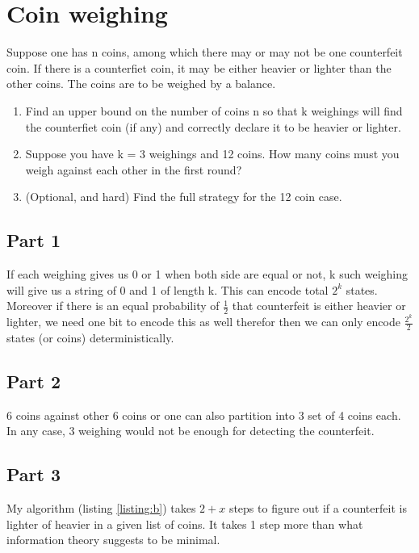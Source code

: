 \documentclass[a4paper,10pt]{article}
\begin{document}
\section{Coin weighing}

Suppose one has n coins, among which there may or may not be one counterfeit
coin. If there is a counterfiet coin, it may be either heavier or lighter than
the other coins. The coins are to be weighed by a balance.

\begin{enumerate}
    \item Find an upper bound on the number of coins n so that k weighings will find the
counterfiet coin (if any) and correctly declare it to be heavier or lighter.
    \item Suppose you have k = 3 weighings and 12 coins. How many coins must you weigh
against each other in the first round?
    \item (Optional, and hard) Find the full strategy for the 12 coin case.
\end{enumerate}

\subsection{Part 1}

If each weighing gives us 0 or 1 when both side are equal or not, k such
weighing will give us a string of 0 and 1 of length k. This can encode total
$2^k$ states. Moreover if there is an equal probability of $\frac{1}{2}$ that
counterfeit is either heavier or lighter, we need one bit to encode this as well
therefor then we can only encode $\frac{2^k}{2}$ states (or coins)
deterministically.

\subsection{Part 2}

6 coins against other 6 coins or one can also partition into 3 set of 4 coins
each. In any case, 3 weighing would not be enough for detecting the counterfeit.

\subsection{Part 3}

My algorithm (listing \ref{listing:b}) takes $2+x$ steps to figure out if a
counterfeit is lighter of heavier in a given list of coins. It takes 1 step more
than what information theory suggests to be minimal.
\end{document}
